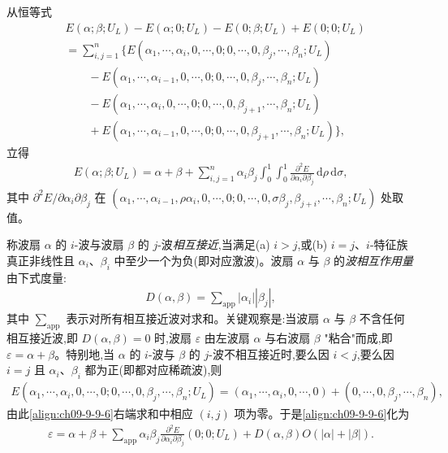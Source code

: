 \documentclass[../../main.tex]{subfiles}
\begin{document}
从恒等式
\begin{align}
&E(\alpha;\beta;U_{L})-E(\alpha;0;U_{L})-E(0;\beta;U_{L})+E(0;0;U_{L})\nonumber\\
&=\sum_{i,j=1}^{n}\big\{E(\alpha_{1},\cdots ,\alpha_{i},0,\cdots ,0;0,\cdots ,0,\beta_{j},\cdots ,\beta_{n};U_{L})\nonumber\\
&\qquad-E(\alpha_{1},\cdots ,\alpha_{i-1},0,\cdots ,0;0,\cdots ,0,\beta_{j},\cdots ,\beta_{n};U_{L})\nonumber\\
&\qquad-E(\alpha_{1},\cdots ,\alpha_{i},0,\cdots ,0;0,\cdots ,0,\beta_{j+1},\cdots ,\beta_{n};U_{L})\nonumber\\
&\qquad+E(\alpha_{1},\cdots ,\alpha_{i-1},0,\cdots ,0;0,\cdots ,0,\beta_{j+1},\cdots ,\beta_{n};U_{L})\big\},
\label{align:ch09-9-9-5}
\end{align}
立得
\begin{align}
E(\alpha;\beta;U_{L})=\alpha+\beta+\sum_{i,j=1}^{n}\alpha_{i}\beta_{j}\int_{0}^{1}\int_{0}^{1}\frac{\partial^{2}E}{\partial\alpha_{i}\partial\beta_{j}}\,\mathrm{d}\rho\,\mathrm{d}\sigma,
\label{align:ch09-9-9-6}
\end{align}
其中 $\partial^{2}E/\partial\alpha_{i}\partial\beta_{j}$ 在 $(\alpha_{1},\cdots ,\alpha_{i-1},\rho\alpha_{i},0,\cdots ,0;0,\cdots ,0,\sigma\beta_{j},\beta_{j+i},\cdots ,\beta_{n};U_{L})$ 处取值。

称波扇 $\alpha$ 的 $i$-波与波扇 $\beta$ 的 $j$-波\emph{相互接近},当满足(a) $i>j$,或(b) $i=j$、$i$-特征族真正非线性且 $\alpha_{i}$、$\beta_{i}$ 中至少一个为负(即对应激波)。波扇 $\alpha$ 与 $\beta$ 的\emph{波相互作用量}由下式度量:
\begin{align}
D(\alpha,\beta)=\sum_{\mathrm{app}}|\alpha_{i}||\beta_{j}|,
\label{align:ch09-9-9-7}
\end{align}
其中 $\sum_{\mathrm{app}}$ 表示对所有相互接近波对求和。关键观察是:当波扇 $\alpha$ 与 $\beta$ 不含任何相互接近波,即 $D(\alpha,\beta)=0$ 时,波扇 $\varepsilon$ 由左波扇 $\alpha$ 与右波扇 $\beta$ "粘合"而成,即 $\varepsilon=\alpha+\beta$。特别地,当 $\alpha$ 的 $i$-波与 $\beta$ 的 $j$-波不相互接近时,要么因 $i<j$,要么因 $i=j$ 且 $\alpha_{i}$、$\beta_{i}$ 都为正(即都对应稀疏波),则
\begin{align}
E(\alpha_{1},\cdots ,\alpha_{i},0,\cdots ,0;0,\cdots ,0,\beta_{j},\cdots ,\beta_{n};U_{L})
=(\alpha_{1},\cdots ,\alpha_{i},0,\cdots ,0)+(0,\cdots ,0,\beta_{j},\cdots ,\beta_{n}),
\label{align:ch09-9-9-8}
\end{align}
由此\eqref{align:ch09-9-9-6}右端求和中相应 $(i,j)$ 项为零。于是\eqref{align:ch09-9-9-6}化为
\begin{align}
\varepsilon=\alpha+\beta+\sum_{\mathrm{app}}\alpha_{i}\beta_{j}\frac{\partial^{2}E}{\partial\alpha_{i}\partial\beta_{j}}(0;0;U_{L})+D(\alpha,\beta)O(|\alpha|+|\beta|).
\label{align:ch09-9-9-9}
\end{align}
\end{document}
